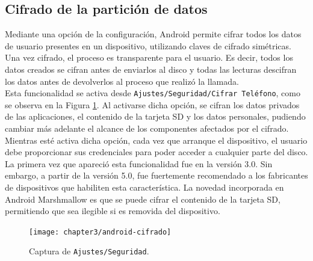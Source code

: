 \subsection{Cifrado de la partición de datos}
Mediante una opción de la configuración, Android permite cifrar todos los datos de usuario presentes en un dispositivo, utilizando claves de cifrado simétricas. Una vez cifrado, el proceso es transparente para el usuario. Es decir, todos los datos creados se cifran antes de enviarlos al disco y todas las lecturas descifran los datos antes de devolverlos al proceso que realizó la llamada.\\
Esta funcionalidad se activa desde \texttt{Ajustes/Seguridad/Cifrar Teléfono}, como se observa en la Figura \ref{fig:ch03:android-cifrado}. Al activarse dicha opción, se cifran los datos privados de las aplicaciones, el contenido de la tarjeta SD y los datos personales, pudiendo cambiar más adelante el alcance de los componentes afectados por el cifrado. Mientras esté activa dicha opción, cada vez que arranque el dispositivo, el usuario debe proporcionar sus credenciales para poder acceder a cualquier parte del disco.\\
La primera vez que apareció esta funcionalidad fue en la versión 3.0. Sin embargo, a partir de la versión 5.0, fue fuertemente recomendado a los fabricantes de dispositivos que habiliten esta característica. La novedad incorporada en Android Marshmallow es que se puede cifrar el contenido de la tarjeta SD, permitiendo que sea ilegible si es removida del dispositivo.\\
\begin{figure}[hbtp]
	\begin{center}
		\texttt{[image: chapter3/android-cifrado]}
		\caption{Captura de \texttt{Ajustes/Seguridad}.}
		\label{fig:ch03:android-cifrado}
	\end{center}
\end{figure}
\newpage
